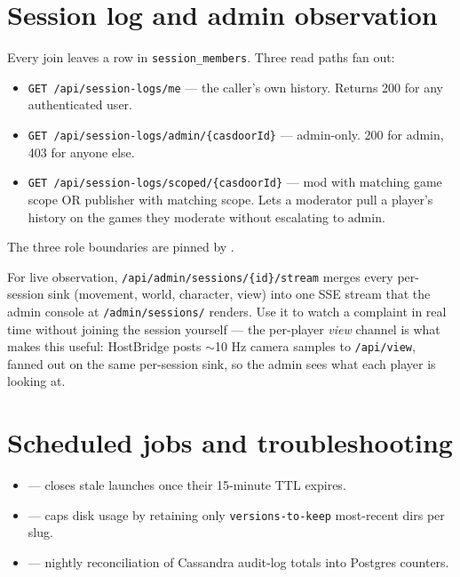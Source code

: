\documentclass[11pt,a4paper,openany]{book}
\begin{document}
\chapter{Session log and admin observation}
Every join leaves a row in \texttt{session\_members}. Three read paths
fan out:

\begin{itemize}
  \item \texttt{GET /api/session-logs/me} --- the caller's own history.
        Returns 200 for any authenticated user.
  \item \texttt{GET /api/session-logs/admin/\{casdoorId\}} ---
        admin-only. 200 for admin, 403 for anyone else.
  \item \texttt{GET /api/session-logs/scoped/\{casdoorId\}} ---
        mod with matching game scope OR publisher with matching scope.
        Lets a moderator pull a player's history on the games they
        moderate without escalating to admin.
\end{itemize}

The three role boundaries are pinned by
.

For live observation, \texttt{/api/admin/sessions/\{id\}/stream}
merges every per-session sink (movement, world, character, view) into
one SSE stream that the admin console at \texttt{/admin/sessions/}
renders. Use it to watch a complaint in real time without joining the
session yourself --- the per-player \emph{view} channel is what makes
this useful: HostBridge posts $\sim$10 Hz camera samples to
\texttt{/api/view}, fanned out on the same per-session sink, so the
admin sees what each player is looking at.

\chapter{Scheduled jobs and troubleshooting}
\begin{itemize}
  \item {} --- closes stale launches once
        their 15-minute TTL expires.
  \item {} --- caps disk usage by retaining
        only \texttt{versions-to-keep} most-recent dirs per slug.
  \item {} --- nightly reconciliation of
        Cassandra audit-log totals into Postgres counters.
\end{itemize}
\end{document}
